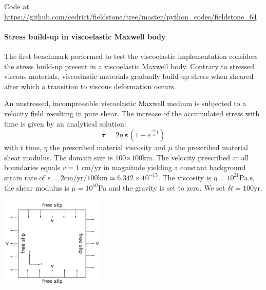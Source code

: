 
Code at \url{https://github.com/cedrict/fieldstone/tree/master/python_codes/fieldstone_64}

\paragraph{Stress build-up in viscoelastic Maxwell body}

The first benchmark performed to test the viscoelastic implementation considers the stress 
build-up present in a viscoelastic Maxwell body. Contrary to stressed viscous materials, 
viscoelastic materials gradually build-up stress when sheared after which a transition to viscous deformation occurs.  

An unstressed, incompressible viscoelastic Maxwell medium is subjected to a velocity field 
resulting in pure shear. 
The increase of the accumulated stress with time is given by an analytical solution:
\begin{equation}
{\bm \tau} = 2\eta\ {\dot{\bm \varepsilon}} \left ( 1-e^{\frac{-\mu }{\eta} t } \right )
\end{equation}
with $t$ time, $\eta$ the prescribed material viscosity and $\mu$ the prescribed material shear modulus. 
The domain size is 100$\times 100$km.
The velocity prescribed at all boundaries equals $v=1$ cm/yr in magnitude yielding a constant 
background strain rate of $\dot{\varepsilon}=2\text{cm/yr}/100\text{km}\simeq 6.342\times 10^{-15}$. 
The viscosity is $\eta= 10^{21}\text{Pa.s}$, the shear modulus is 
$\mu =10^{10}$Pa and the gravity is set to zero. We set $\delta t=100$yr.  

\begin{center}
\includegraphics[width=5cm]{python_codes/fieldstone_64/images/stress_buildup_setup.png}\\
\end{center}

